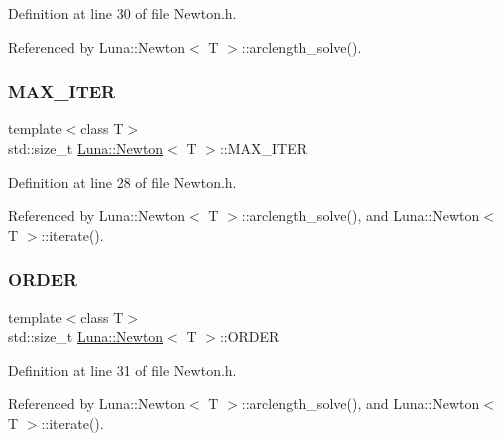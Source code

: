 Definition at line 30 of file Newton.\+h.



Referenced by Luna\+::\+Newton$<$ T $>$\+::arclength\+\_\+solve().

\mbox{\label{classLuna_1_1Newton_ac8245444273c58c656a78ab0544833ce}} 
\subsubsection{\texorpdfstring{M\+A\+X\+\_\+\+I\+T\+ER}{MAX\_ITER}}
{\footnotesize\ttfamily template$<$class T$>$ \\
std\+::size\+\_\+t \hyperlink{classLuna_1_1Newton}{Luna\+::\+Newton}$<$ T $>$\+::M\+A\+X\+\_\+\+I\+T\+ER\hspace{0.3cm}{\ttfamily [protected]}}



Definition at line 28 of file Newton.\+h.



Referenced by Luna\+::\+Newton$<$ T $>$\+::arclength\+\_\+solve(), and Luna\+::\+Newton$<$ T $>$\+::iterate().

\mbox{\label{classLuna_1_1Newton_a7d549b60ff6d4285d8cbbf6f958c7d88}} 
\subsubsection{\texorpdfstring{O\+R\+D\+ER}{ORDER}}
{\footnotesize\ttfamily template$<$class T$>$ \\
std\+::size\+\_\+t \hyperlink{classLuna_1_1Newton}{Luna\+::\+Newton}$<$ T $>$\+::O\+R\+D\+ER\hspace{0.3cm}{\ttfamily [protected]}}



Definition at line 31 of file Newton.\+h.



Referenced by Luna\+::\+Newton$<$ T $>$\+::arclength\+\_\+solve(), and Luna\+::\+Newton$<$ T $>$\+::iterate().

\mbox{\label{classLuna_1_1Newton_a5cb2983ea8e24c4832a3fb0bdde84b8f}} 
